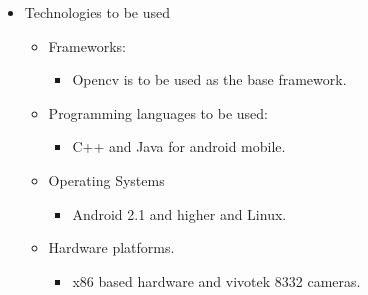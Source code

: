 \documentclass[letterpaper]{article}
\begin{document}
\begin{itemize}
\begin{itemize}
			\item Technologies to be used
			\begin{itemize}
				\item	Frameworks:
				\begin{itemize}				
				\item	Opencv is to be used as the base framework.
				\end{itemize}
				
				\item	Programming languages to be used:
				\begin{itemize}
				\item	C++ and Java for android mobile.
				\end{itemize}
				
				\item	Operating Systems
				\begin{itemize}
				\item	Android 2.1 and higher and Linux.
				\end{itemize}
				
				\item	Hardware platforms.
				\begin{itemize}
				\item	x86 based hardware and vivotek 8332 cameras.
				\end{itemize}
				
				
		\end{itemize}
		\end{itemize}
		\end{itemize}
		
		\vspace{0.2in}
		
		\section*{\colorbox{blue}{}} 
		
\end{document}
